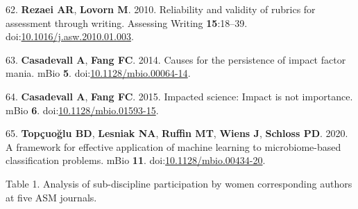 \documentclass[11pt,]{article}
\begin{document}
\leavevmode\hypertarget{ref-Rezaei2010}{}%
62. \textbf{Rezaei AR}, \textbf{Lovorn M}. 2010. Reliability and
validity of rubrics for assessment through writing. Assessing Writing
\textbf{15}:18--39.
doi:\href{https://doi.org/10.1016/j.asw.2010.01.003}{10.1016/j.asw.2010.01.003}.

\leavevmode\hypertarget{ref-Casadevall2014}{}%
63. \textbf{Casadevall A}, \textbf{Fang FC}. 2014. Causes for the
persistence of impact factor mania. mBio \textbf{5}.
doi:\href{https://doi.org/10.1128/mbio.00064-14}{10.1128/mbio.00064-14}.

\leavevmode\hypertarget{ref-Casadevall2015}{}%
64. \textbf{Casadevall A}, \textbf{Fang FC}. 2015. Impacted science:
Impact is not importance. mBio \textbf{6}.
doi:\href{https://doi.org/10.1128/mbio.01593-15}{10.1128/mbio.01593-15}.

\leavevmode\hypertarget{ref-Topuolu2020}{}%
65. \textbf{Topçuoğlu BD}, \textbf{Lesniak NA}, \textbf{Ruffin MT},
\textbf{Wiens J}, \textbf{Schloss PD}. 2020. A framework for effective
application of machine learning to microbiome-based classification
problems. mBio \textbf{11}.
doi:\href{https://doi.org/10.1128/mbio.00434-20}{10.1128/mbio.00434-20}.

\newpage

Table 1. Analysis of sub-discipline participation by women corresponding
authors at five ASM journals.
\end{document}
